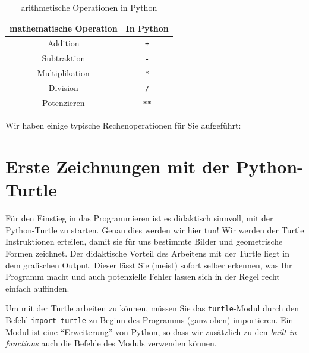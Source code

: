 \begin{myoverview}\label{myoverview:arithm-op}
	\begin{table}[H]
		\centering
		\begin{tabular}{c|c}
			\textbf{mathematische Operation} & \textbf{In Python} \\\midrule\midrule
			Addition                         & \lstinline|+|      \\\midrule
			Subtraktion                      & \lstinline|-|      \\\midrule
			Multiplikation                   & \lstinline|*|      \\\midrule
			Division                         & \lstinline|/|      \\\midrule
			Potenzieren                      & \lstinline|**|
		\end{tabular}
		\caption{arithmetische Operationen in Python}
		\label{tab:arithm-op}
	\end{table}
\end{myoverview}
\begin{myexample}\label{myexample:basisoperationen}
Wir haben einige typische Rechenoperationen für Sie aufgeführt:

\end{myexample}

\section{Erste Zeichnungen mit der Python-Turtle}
Für den Einstieg in das Programmieren ist es didaktisch sinnvoll, mit der Python-Turtle zu starten. Genau dies werden wir hier tun! Wir werden der Turtle Instruktionen erteilen, damit sie für uns bestimmte Bilder und geometrische Formen zeichnet. Der didaktische Vorteil des Arbeitens mit der Turtle liegt in dem grafischen Output. Dieser lässt Sie (meist) sofort selber erkennen, was Ihr Programm macht und auch potenzielle Fehler lassen sich in der Regel recht einfach auffinden.

Um mit der Turtle arbeiten zu können, müssen Sie das \lstinline|turtle|-Modul durch den Befehl \lstinline|import turtle| zu Beginn des Programms (ganz oben) importieren. Ein Modul ist eine \enquote{Erweiterung} von Python, so dass wir zusätzlich zu den \emph{built-in functions} auch die Befehle des Moduls verwenden können.

